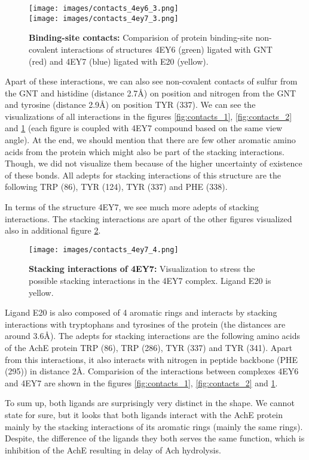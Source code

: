 \documentclass[10pt,a4paper,twocolumn]{article}
\begin{document}
\begin{figure}[tb]
    \centering
    \texttt{[image: images/contacts\_4ey6\_3.png]}
    \\[\smallskipamount]
    \texttt{[image: images/contacts\_4ey7\_3.png]}
    \caption{\textbf{Binding-site contacts:} 
    Comparision of protein binding-site non-covalent interactions 
    of structures 4EY6 (green) ligated with GNT (red) and 
    4EY7 (blue) ligated with E20 (yellow).}
    \label{fig:contacts_3}
\end{figure} 


Apart of these interactions, we can also see non-covalent contacts of 
sulfur from the GNT and histidine (distance 2.7\AA) on position and nitrogen
from the GNT and tyrosine (distance 2.9\AA) on position TYR (337). 
We can see the visualizations
of all interactions in the figures \ref{fig:contacts_1}, 
\ref{fig:contacts_2} and \ref{fig:contacts_3} (each figure is coupled 
with 4EY7 compound based on the same view angle). At the end, 
we should mention that there are few other aromatic amino acids 
from the protein which might also be part of the stacking 
interactions. Though, we did not visualize them because of the 
higher uncertainty of existence of these bonds. All adepts for
stacking interactions of this structure are the following 
TRP (86), TYR (124), TYR (337) and PHE (338).

In terms of the structure 4EY7, we see much more adepts of stacking 
interactions. The stacking interactions are apart of the other figures visualized
also in additional figure \ref{fig:contacts_4}.


\begin{figure}[tb]
    \centering
    \texttt{[image: images/contacts\_4ey7\_4.png]}
    \caption{\textbf{Stacking interactions of 4EY7:} 
    Visualization to stress the possible stacking interactions in the
    4EY7 complex. Ligand E20 is yellow.}
    \label{fig:contacts_4}
\end{figure}


Ligand E20 is also composed of 4 aromatic rings and interacts by 
stacking interactions with tryptophans and tyrosines of the protein
(the distances are around 3.6\AA). The adepts for stacking interactions
are the following amino acids of the AchE protein 
TRP (86), TRP (286), TYR (337) and TYR (341).
Apart from this interactions, 
it also interacts with nitrogen in peptide backbone (PHE (295)) 
in distance 2\AA.
Comparision of the interactions between complexes 4EY6 and 4EY7 
are shown in the figures \ref{fig:contacts_1}, \ref{fig:contacts_2}
and \ref{fig:contacts_3}.
  

To sum up, both ligands are surprisingly very distinct in the shape.
We cannot state for sure, but it looks that both ligands interact
with the AchE protein mainly by the stacking interactions of its
aromatic rings (mainly the same rings). 
Despite, the difference of the ligands they both 
serves the same function, which is inhibition of the AchE resulting
in delay of Ach hydrolysis. 


\clearpage


\end{document}
